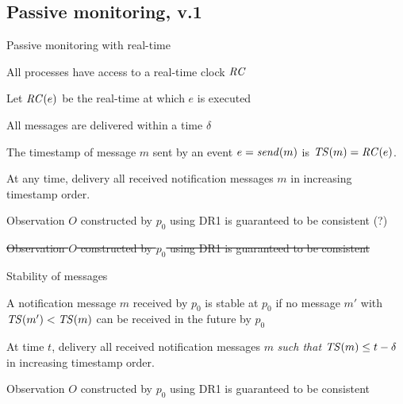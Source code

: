 \subsection{Passive monitoring, v.1}

\begin{frame}{Passive monitoring with real-time}

\BI
\item All processes have access to a real-time clock $\mathit{RC}$
\item Let $\mathit{RC}(e)$ be the real-time at which $e$ is executed
\item All messages are delivered within a time $\delta$
\item The timestamp of message $m$ sent by an event $e = \mathit{send}(m)$
  is $\mathit{TS}(m) = \mathit{RC}(e)$.
\EI
\begin{definition}
At any time, delivery all received notification messages $m$ 
in increasing timestamp order.
\end{definition}
\begin{overprint}
\begin{theorem}
Observation $O$ constructed by $p_0$ using DR1 is guaranteed to be
consistent (?)
\end{theorem}
\begin{theorem}
\sout{
Observation $O$ constructed by $p_0$ using DR1 is guaranteed to be
consistent
}
\end{theorem}
\end{overprint}


\end{frame}

\begin{frame}{Stability of messages}

\begin{definition}[Stability] A notification message $m$ received by $p_0$ is \alert{stable at $p_0$} if no message
$m'$ with $\mathit{TS}(m') < \mathit{TS}(m)$ can be received in the future by $p_0$
\end{definition}


\begin{definition}
At time $t$, delivery all received notification messages $m$ \emph{such that
$\mathit{TS}(m) \leq t-\delta$} in increasing timestamp order.
\end{definition}
\medskip
\begin{theorem}
Observation $O$ constructed by $p_0$ using DR1 is guaranteed to be
consistent
\end{theorem}


\end{frame}



